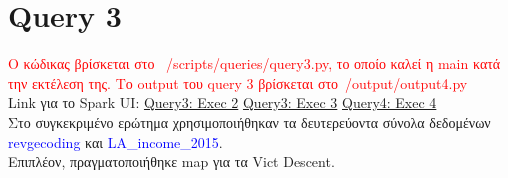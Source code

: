 \documentclass{article}
\begin{document}
\vspace{4\baselineskip}

\section{Query 3}

\textcolor{red}{Ο κώδικας βρίσκεται στο  /scripts/queries/query3.py, το οποίο καλεί η main κατά την εκτέλεση της.}
\textcolor{red}{Το output του query 3 βρίσκεται στο /output/output4.py} \\
Link για το Spark UI: 
\href{http://83.212.81.191:18080/history/application_1705357398960_0014/jobs/} {Query3: Exec 2} 
\href{http://83.212.81.191:18080/history/application_1705357398960_0015/jobs/} {Query3: Exec 3} 
\href{http://83.212.81.191:18080/history/application_1705357398960_0016/jobs/} {Query4: Exec 4} \\
Στο συγκεκριμένο ερώτημα χρησιμοποιήθηκαν τα δευτερεύοντα σύνολα δεδομένων 
\textcolor{blue}{revgecoding} και \textcolor{blue}{LA\_income\_2015}. \\
Επιπλέον, πραγματοποιήθηκε map για τα Vict  Descent. \\
\end{document}
